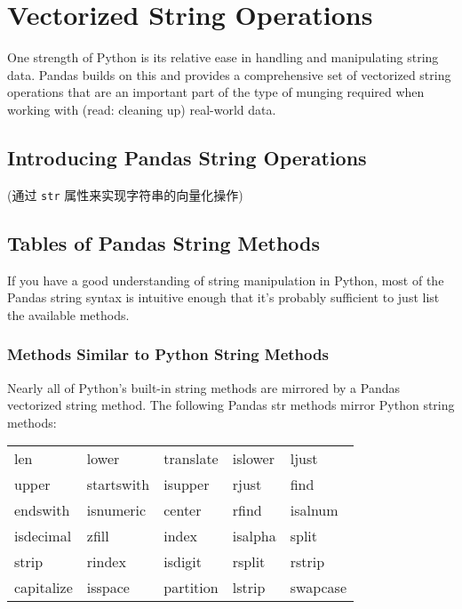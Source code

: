 \chapter{Vectorized String Operations\label{Ch22}}
One strength of Python is its relative ease in handling and manipulating string data.
Pandas builds on this and provides a comprehensive set of vectorized string operations
that are an important part of the type of munging required when working with (read:
cleaning up) real-world data.


\section{Introducing Pandas String Operations}
(通过 \verb|str| 属性来实现字符串的向量化操作)
\section{Tables of Pandas String Methods}
If you have a good understanding of string manipulation in Python, most of the Pandas string syntax is intuitive enough that it's probably sufficient to just list the available methods.

\subsection*{Methods Similar to Python String Methods}
Nearly all of Python's built-in string methods are mirrored by a Pandas vectorized
string method. The following Pandas str methods mirror Python string methods:
\begin{table}[H]
    \centering
    \begin{tabular}{lllll}
        \hline
        len        & lower      & translate & islower & ljust    \\
        upper      & startswith & isupper   & rjust   & find     \\
        endswith   & isnumeric  & center    & rfind   & isalnum  \\
        isdecimal  & zfill      & index     & isalpha & split    \\
        strip      & rindex     & isdigit   & rsplit  & rstrip   \\
        capitalize & isspace    & partition & lstrip  & swapcase \\
        \hline
    \end{tabular}
\end{table}

